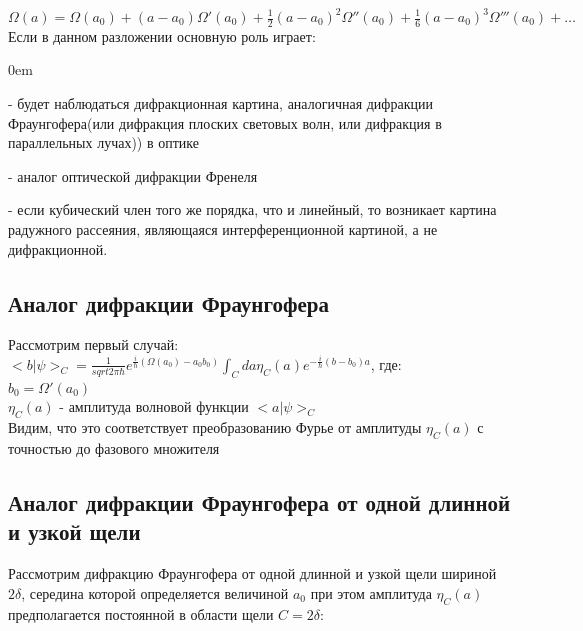 \documentclass[11pt]{report}
\begin{document}
$\Omega(a) = \Omega(a_0)+(a-a_0)\Omega'(a_0)+\frac{1}{2}(a-a_0)^2\Omega''(a_0)+\frac{1}{6}(a-a_0)^3\Omega'''(a_0) + \dots$ \\

Если в данном разложении основную роль играет: \\

\begin{description}
\addtolength{\itemindent}{0.80cm}
\itemsep0em 
\item[$(a-a_0)\Omega'(a_0)$] - будет наблюдаться дифракционная картина, аналогичная дифракции Фраунгофера(или дифракция плоских световых волн, или дифракция в параллельных лучах)) в оптике
\item[$\frac{1}{2}(a-a_0)^2\Omega''(a_0)$ ] - аналог оптической дифракции Френеля
\item[$|\Omega''(a_0)| \ll |\Omega'(a_0)| \text{и} |\Omega''(a_0)| \ll |\Omega'''(a_0)|$] - если кубический член того же порядка, что и линейный, то возникает картина радужного рассеяния, являющаяся интерференционной картиной, а не дифракционной. 
\end{description}

\subsection{Аналог дифракции Фраунгофера}
Рассмотрим первый случай: \\

$<b|\psi>_C=\frac{1}{sqrt 2 \pi \hbar}e^{\frac{i}{\hbar}(\Omega(a_0)-a_0b_0)}\int_Cda\eta_C(a)e^{-\frac{i}{\hbar}(b-b_0)a}$, где: \\

$b_0=\Omega'(a_0)$\\

$\eta_C(a)$ - амплитуда волновой функции $<a|\psi>_C$\\

Видим, что это соответствует преобразованию Фурье от амплитуды $\eta_C(a)$ с точностью до фазового множителя\\

\subsection{Аналог дифракции Фраунгофера от одной длинной и узкой щели}
Рассмотрим дифракцию Фраунгофера от одной длинной и узкой щели шириной $2\delta$, середина которой определяется величиной $ a_0 $ при этом амплитуда $\eta_C(a)$ предполагается постоянной в области щели $C=2\delta$:  \\
\end{document}
